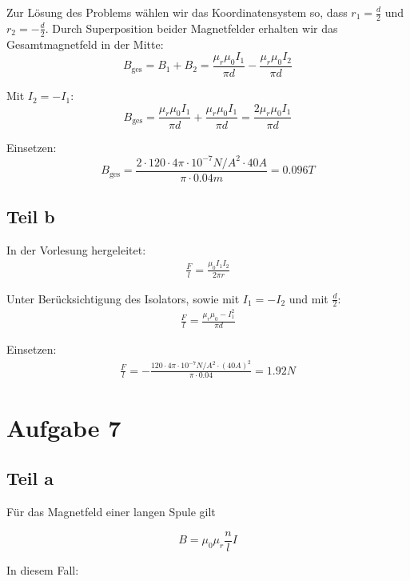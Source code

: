 \documentclass[a4paper,german,12pt,smallheadings]{scrartcl}
\begin{document}
Zur Lösung des Problems wählen wir das Koordinatensystem so, dass
$r_1=\frac{d}{2}$ und $r_2=-\frac{d}{2}$. Durch Superposition beider
Magnetfelder erhalten wir das Gesamtmagnetfeld in der Mitte:
\begin{equation*}
B_{\text{ges}}=B_1+B_2= \frac{\mu_r \mu_0 I_1}{\pi d}- \frac{\mu_r \mu_0 I_2}{\pi d}
\end{equation*}

Mit $I_2=-I_1$:
\begin{equation*}
B_{\text{ges}}=\frac{\mu_r \mu_0 I_1}{\pi d}+ \frac{\mu_r \mu_0 I_1}{\pi d}=\frac{2\mu_r \mu_0 I_1}{\pi d}
\end{equation*}

Einsetzen:
\begin{equation*}
B_{\text{ges}}=\frac{2\cdot 120 \cdot 4\pi \cdot 10^{-7} N/A^2 \cdot 40A}{\pi \cdot 0.04m} =0.096T
\end{equation*}

\subsection*{Teil b}

In der Vorlesung hergeleitet:
\begin{align*}
\frac{F}{l}=\frac{\mu_0 I_1 I_2}{2 \pi r}
\end{align*}

Unter Berücksichtigung des Isolators, sowie mit $I_1=-I_2$ und  mit $\frac{d}{2}$:
\begin{align*}
\frac{F}{l}=\frac{\mu_r \mu_0 -I_1^2}{\pi d}
\end{align*}

Einsetzen:
\begin{align*}
\frac{F}{l}=-\frac{120 \cdot 4\pi \cdot 10^{-7}N/A^2 \cdot (40A)^2}{\pi \cdot 0.04}=1.92N
\end{align*}

\section*{Aufgabe 7}
\subsection*{Teil a}
Für das Magnetfeld einer langen Spule gilt

\begin{equation}
  B = \mu_0 \mu_r \frac{n}{l} I
\end{equation}

In diesem Fall:
\end{document}
